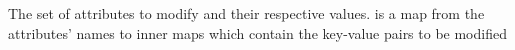 The set of attributes to modify and their respective values.   is
a map from the attributes' names to inner maps which contain the key-value pairs
to be modified
